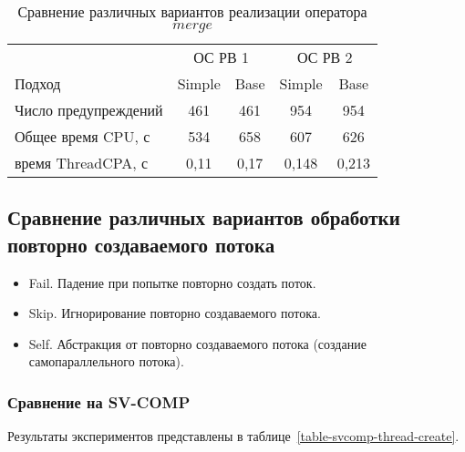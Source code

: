 \begin{center}
  \begin{table}[h]\footnotesize \centering
  	\label{table-os-thread}
    \caption{Сравнение различных вариантов реализации оператора $merge$}
    \begin{tabular}{ | l | c | c | c | c |}
      \hline
      		& 		\multicolumn{2}{|c|}{ОС РВ 1} & \multicolumn{2}{|c|}{ОС РВ 2} 	\\
      Подход         					& Simple 	& Base 	& Simple 	& Base 		\\ \hline
      Число предупреждений 				& 461    	& 461   & 954      	& 954  		\\ 
      Общее время CPU, с				& 534      	& 658   & 607      	& 626  		\\ 
  \hspace{0.5cm} время ThreadCPA, с 	& 0,11 		& 0,17  & 0,148    	& 0,213   	\\
      \hline
    \end{tabular}
  \end{table}
\end{center}

\subsection{Сравнение различных вариантов обработки повторно создаваемого потока }

\begin{itemize}
\item Fail. Падение при попытке повторно создать поток.
\item Skip. Игнорирование повторно создаваемого потока.
\item Self. Абстракция от повторно создаваемого потока (создание самопараллельного потока).
\end{itemize}

\subsubsection{Сравнение на SV-COMP}
Результаты экспериментов представлены в таблице~\ref{table-svcomp-thread-create}.

